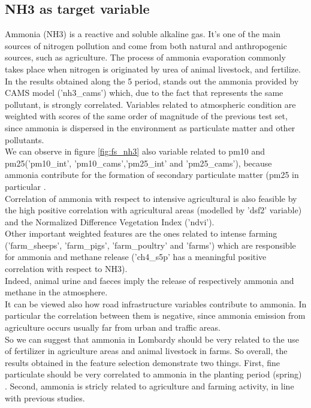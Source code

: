 \subsection{NH3 as target variable}
Ammonia (NH3) is a reactive and soluble alkaline gas. It's one of the main sources of nitrogen pollution and come from both natural and anthropogenic sources, such as agriculture.
The process of ammonia evaporation commonly takes place when nitrogen is originated by urea of animal livestock, and fertilize. \\
In the results obtained along the 5 period, stands out the ammonia provided by CAMS model ('nh3\_cams') which, due to the fact that represents the same pollutant, is strongly correlated. Variables related to atmospheric condition are weighted with scores of the same order of magnitude of the previous test set, since ammonia is dispersed in the environment as particulate matter and other pollutants.\\
We can observe in figure \ref{fig:fs_nh3} also variable related to pm10 and pm25('pm10\_int', 'pm10\_cams','pm25\_int' and 'pm25\_cams'), because ammonia contribute for the formation of secondary particulate matter (pm25 in particular\cite{zhu2015sources} .\\
Correlation of ammonia with respect to intensive agricultural is also feasible by the high positive correlation with agricultural areas (modelled by 'dsf2' variable) and the Normalized Difference Vegetation Index ('ndvi').\\
Other important weighted features are the ones related to intense farming ('farm\_sheeps', 'farm\_pigs', 'farm\_poultry' and 'farms') which are responsible for ammonia and methane release ('ch4\_s5p' has a meaningful positive correlation with respect to NH3).\\
Indeed, animal urine and faeces imply the release of respectively ammonia and methane in the atmosphere\cite{saggar2004review}.\\
It can be viewed also how road infrastructure variables contribute to ammonia. In particular the correlation between them is negative, since ammonia emission from agriculture occurs usually far from urban and traffic areas.\\
So we can suggest that ammonia in Lombardy should be very related to the use of fertilizer in agriculture areas and animal livestock in farms.
\bigbreak
So overall, the results obtained in the feature selection demonstrate two things.  
First, fine particulate should be very correlated to ammonia in the planting period (spring) . Second, ammonia is stricly related to agriculture and farming activity, in line with previous studies.
